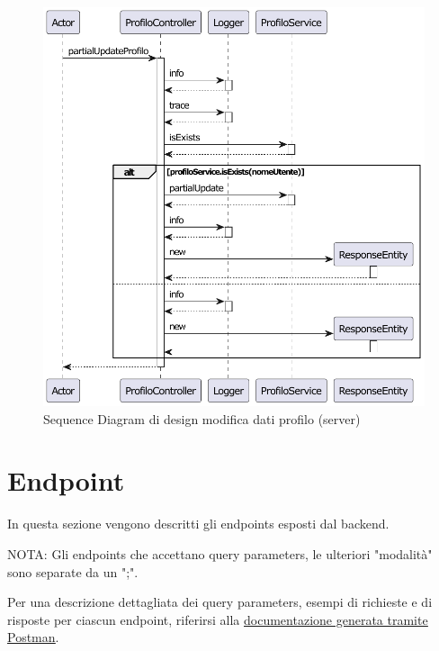             \begin{figure}[htbp!]
                \centering
                    \includegraphics[width=1\linewidth]{Immagini/Diagrammi/Sequence Diagram/Design/Server Sequence Design/ServerSequenceModificaProfiloDesign.pdf}
                \caption{Sequence Diagram di design modifica dati profilo (server)}
                \label{fig:Sequence Diagram di design modifica dati profilo (server)}
            \end{figure}
    
    \clearpage

    \section{Endpoint}
        In questa sezione vengono descritti gli endpoints esposti dal backend. 
        
        NOTA: Gli endpoints che accettano query parameters, le ulteriori "modalità" sono separate da un ";".

        Per una descrizione dettagliata dei query parameters, esempi di richieste e di risposte per ciascun endpoint, riferirsi alla \href{https://documenter.getpostman.com/view/37147881/2sAYBd67Sj}{\underline{documentazione generata tramite Postman}}.
    
